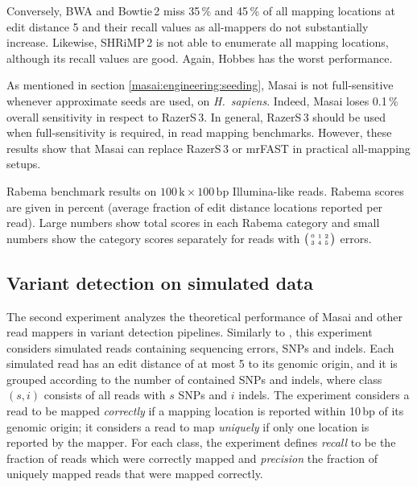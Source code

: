 Conversely, BWA and Bowtie\,2 miss 35\,\% and 45\,\% of all mapping locations at edit distance 5 and their recall values as all-mappers do not substantially increase.
Likewise, SHRiMP\,2 is not able to enumerate all mapping locations, although its recall values are good.
Again, Hobbes has the worst performance.

As mentioned in section \ref{masai:engineering:seeding}, Masai is not full-sensitive whenever approximate seeds are used, \eg on \emph{H.~sapiens}. Indeed, Masai loses 0.1\,\% overall sensitivity in respect to RazerS\,3.
In general, RazerS\,3 should be used when full-sensitivity is required, \ie in read mapping benchmarks.
However, these results show that Masai can replace RazerS\,3 or mrFAST in practical all-mapping setups.

\begin{table*}[t]
  \caption[Masai results in the Rabema benchmark]
  {
  \label{tab:masai:rabema}
    Rabema benchmark results on $100\,\text{k}\times 100\,\text{bp}$ Illumina-like reads.
    Rabema scores are given in percent (average fraction of edit distance locations reported per read).
    Large numbers show total scores in each Rabema category and small numbers show the category scores separately for reads with $\bigl(\begin{smallmatrix}\mbox{\tiny 0}&\mbox{\tiny 1}&\mbox{\tiny 2}\\\mbox{\tiny 3}&\mbox{\tiny 4}&\mbox{\tiny 5}\end{smallmatrix}\bigr)$ errors.
    }
  \vspace{-3mm}
  \center
  \sffamily
  \resizebox{\textwidth}{!}
  {
	\renewcommand{\tabcolsep}{0.8ex}
	
  }
\end{table*}

\subsection{Variant detection on simulated data}
\label{masai:evaluation:variant}

The second experiment analyzes the theoretical performance of Masai and other read mappers in variant detection pipelines.
Similarly to \citep{David2011}, this experiment considers simulated reads containing sequencing errors, SNPs and indels.
Each simulated read has an edit distance of at most 5 to its genomic origin, and it is grouped according to the number of contained SNPs and indels, where class $(s,i)$ consists of all reads with $s$ SNPs and $i$ indels.
The experiment considers a read to be mapped \emph{correctly} if a mapping location is reported within 10\,bp of its genomic origin;
it considers a read to map \emph{uniquely} if only one location is reported by the mapper.
For each class, the experiment defines \emph{recall} to be the fraction of reads which were correctly mapped and \emph{precision} the fraction of uniquely mapped reads that were mapped correctly.

